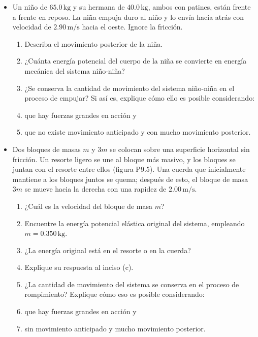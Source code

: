\documentclass[11pt,a4paper]{article}
\begin{document}
\begin{itemize}
    \item[\textbf{4.}] Un niño de \(65.0\,\text{kg}\) y su hermana de \(40.0\,\text{kg}\), ambos con patines, están frente a frente en reposo. La niña empuja duro al niño y lo envía hacia atrás con velocidad de \(2.90\,\text{m/s}\) hacia el oeste. Ignore la fricción.
    \begin{enumerate}
        \item Describa el movimiento posterior de la niña.
        \item ¿Cuánta energía potencial del cuerpo de la niña se convierte en energía mecánica del sistema niño-niña?
        \item ¿Se conserva la cantidad de movimiento del sistema niño-niña en el proceso de empujar? Si así es, explique cómo ello es posible considerando:
        \item que hay fuerzas grandes en acción y
        \item que no existe movimiento anticipado y con mucho movimiento posterior.
    \end{enumerate}
    \vspace*{7cm}

    \item[\textbf{5.}] Dos bloques de masas \(m\) y \(3m\) se colocan sobre una superficie horizontal sin fricción. Un resorte ligero se une al bloque más masivo, y los bloques se juntan con el resorte entre ellos (figura P9.5). Una cuerda que inicialmente mantiene a los bloques juntos se quema; después de esto, el bloque de masa \(3m\) se mueve hacia la derecha con una rapidez de \(2.00\,\text{m/s}\).
    \begin{enumerate}
        \item ¿Cuál es la velocidad del bloque de masa \(m\)?
        \item Encuentre la energía potencial elástica original del sistema, empleando \(m = 0.350\,\text{kg}\).
        \item ¿La energía original está en el resorte o en la cuerda?
        \item Explique su respuesta al inciso (c).
        \item ¿La cantidad de movimiento del sistema se conserva en el proceso de rompimiento? Explique cómo eso es posible considerando:
        \item que hay fuerzas grandes en acción y
        \item sin movimiento anticipado y mucho movimiento posterior.
    \end{enumerate}
    \vspace*{8cm}
\end{itemize}
\end{document}

